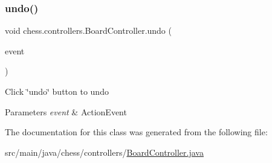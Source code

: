 \subsubsection{\texorpdfstring{undo()}{undo()}}
{\footnotesize\ttfamily void chess.\+controllers.\+Board\+Controller.\+undo (\begin{DoxyParamCaption}\item[{Action\+Event}]{event }\end{DoxyParamCaption})}

Click \char`\"{}undo\char`\"{} button to undo


\begin{DoxyParams}{Parameters}
{\em event} & Action\+Event \\
\hline
\end{DoxyParams}


The documentation for this class was generated from the following file\+:\begin{DoxyCompactItemize}
\item 
src/main/java/chess/controllers/\mbox{\hyperlink{_board_controller_8java}{Board\+Controller.\+java}}\end{DoxyCompactItemize}
